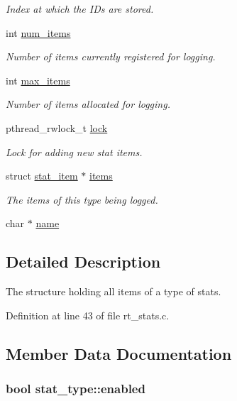 \begin{DoxyCompactItemize}
\begin{DoxyCompactList}\small\item\em Index at which the I\-Ds are stored. \end{DoxyCompactList}\item 
int \hyperlink{structstat__type_a58e7d3ee8ef48ab267367fc3266a9113}{num\-\_\-items}
\begin{DoxyCompactList}\small\item\em Number of items currently registered for logging. \end{DoxyCompactList}\item 
int \hyperlink{structstat__type_af697600ffa976b8c4530f7e20e817023}{max\-\_\-items}
\begin{DoxyCompactList}\small\item\em Number of items allocated for logging. \end{DoxyCompactList}\item 
pthread\-\_\-rwlock\-\_\-t \hyperlink{structstat__type_a22f632f9d74f51d3bd8d95a5c8b2536e}{lock}
\begin{DoxyCompactList}\small\item\em Lock for adding new stat items. \end{DoxyCompactList}\item 
struct \hyperlink{structstat__item}{stat\-\_\-item} $\ast$ \hyperlink{structstat__type_a15ccf932c19f6e6b07a3575a956cfacd}{items}
\begin{DoxyCompactList}\small\item\em The items of this type being logged. \end{DoxyCompactList}\item 
char $\ast$ \hyperlink{structstat__type_ae4e7f67c4950bcfbe35ba672bcfd6923}{name}
\end{DoxyCompactItemize}


\subsection{Detailed Description}
The structure holding all items of a type of stats. 

Definition at line 43 of file rt\-\_\-stats.\-c.



\subsection{Member Data Documentation}
\hypertarget{structstat__type_a3c657ea7ad6abd10ce5f50feafd7dae0}{
\subsubsection[{enabled}]{\setlength{\rightskip}{0pt plus 5cm}bool stat\-\_\-type\-::enabled}}\label{structstat__type_a3c657ea7ad6abd10ce5f50feafd7dae0}


